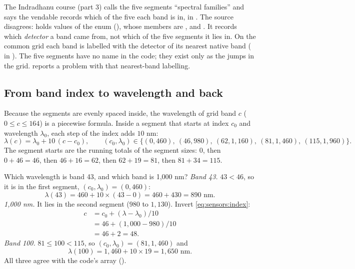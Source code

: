 \begin{sourcenote}
The Indradhanu course (part 3) calls the five segments ``spectral families'' and says the vendable
records which of the five each band is in, in . The source disagrees:
 holds values of the enum 
(), whose members are
,  and . It records which \emph{detector} a band came
from, not which of the five segments it lies in. On the common grid each band is labelled with
the detector of its nearest native band ( in
). The five segments have no name in
the code; they exist only as the jumps in the grid.  reports a problem with
that nearest-band labelling.
\end{sourcenote}

\subsection{From band index to wavelength and back}

Because the segments are evenly spaced inside, the wavelength of grid band $c$ ($0 \le c \le 164$)
is a piecewise formula. Inside a segment that starts at index $c_0$ and wavelength $\lambda_0$,
each step of the index adds $10$ nm:
\begin{equation}\label{eq:sensors:index}
\lambda(c) = \lambda_0 + 10\,(c - c_0), \qquad
(c_0, \lambda_0) \in \{(0, 460),\ (46, 980),\ (62, 1{,}160),\ (81, 1{,}460),\ (115, 1{,}960)\}.
\end{equation}
The segment starts are the running totals of the segment sizes: $0$, then $0 + 46 = 46$, then
$46 + 16 = 62$, then $62 + 19 = 81$, then $81 + 34 = 115$.

\begin{worked}[label={we:sensors:index}]{Which wavelength is band 43, and which band is 1,000 nm?}
\emph{Band 43.} $43 < 46$, so it is in the first segment, $(c_0, \lambda_0) = (0, 460)$:
\[ \lambda(43) = 460 + 10 \times (43 - 0) = 460 + 430 = 890 \text{ nm}. \]
\emph{1,000 nm.} It lies in the second segment ($980$ to $1{,}130$). Invert
\cref{eq:sensors:index}:
\begin{align*}
c &= c_0 + (\lambda - \lambda_0)/10\\
  &= 46 + (1{,}000 - 980)/10\\
  &= 46 + 2 = 48.
\end{align*}
\emph{Band 100.} $81 \le 100 < 115$, so $(c_0, \lambda_0) = (81, 1{,}460)$ and
\[ \lambda(100) = 1{,}460 + 10 \times 19 = 1{,}650 \text{ nm}. \]
All three agree with the code's array ()\tagC.
\end{worked}

